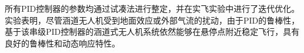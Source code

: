 所有PID控制器的参数均通过试凑法进行整定，并在实飞实验中进行了迭代优化。实验表明，尽管涵道无人机受到地面效应或外部气流的扰动，由于PID的鲁棒性，基于该串级PID控制器的涵道式无人机系统依然能够在悬停点附近稳定飞行，具有良好的鲁棒性和动态响应特性。









